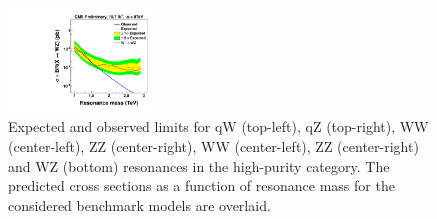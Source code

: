 \begin{figure}[h!tpb]
\begin{center}
\includegraphics[width=0.35\textwidth]{figs/limits/brazilianFlag_WZ_high_purity.pdf}
\end{center}
\caption{Expected and observed limits for qW (top-left), qZ (top-right), \GRS WW (center-left), \GRS ZZ (center-right), \GBulk WW (center-left), \GBulk ZZ (center-right) and WZ (bottom) resonances in the high-purity category.
  The predicted cross sections as a function of resonance mass for the considered benchmark models are overlaid.}
\label{fig:Vtagresults1}
\end{figure}

